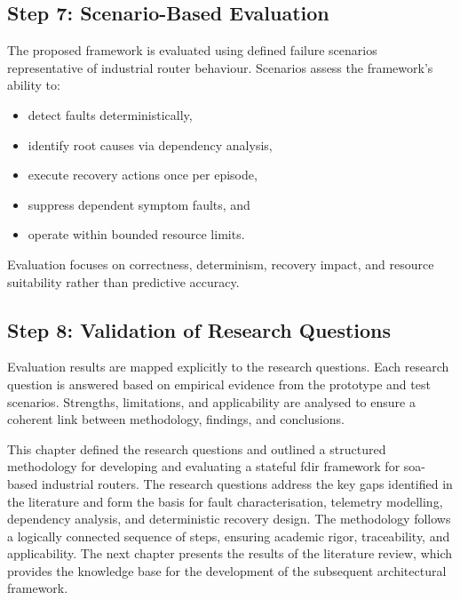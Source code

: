 \subsection*{Step 7: Scenario-Based Evaluation}

The proposed framework is evaluated using defined failure scenarios representative of industrial router behaviour. Scenarios assess the framework's ability to:
\begin{itemize}
\item detect faults deterministically,
\item identify root causes via dependency analysis,
\item execute recovery actions once per episode,
\item suppress dependent symptom faults, and
\item operate within bounded resource limits.
\end{itemize}

Evaluation focuses on correctness, determinism, recovery impact, and resource suitability rather than predictive accuracy.

\subsection*{Step 8: Validation of Research Questions}

Evaluation results are mapped explicitly to the research questions. Each research question is answered based on empirical evidence from the prototype and test scenarios. Strengths, limitations, and applicability are analysed to ensure a coherent link between methodology, findings, and conclusions.

This chapter defined the research questions and outlined a structured methodology for developing and evaluating a stateful \gls{fdir} framework for \gls{soa}-based industrial routers. The research questions address the key gaps identified in the literature and form the basis for fault characterisation, telemetry modelling, dependency analysis, and deterministic recovery design. The methodology follows a logically connected sequence of steps, ensuring academic rigor, traceability, and applicability. The next chapter presents the results of the literature review, which provides the knowledge base for the development of the subsequent architectural framework.
